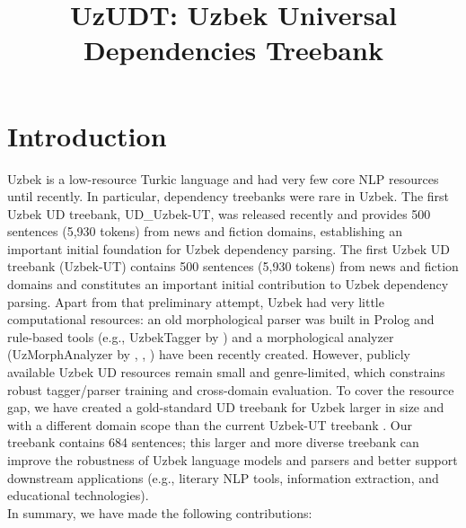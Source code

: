 \documentclass[10pt, a4paper]{article}
\title{UzUDT: Uzbek Universal Dependencies Treebank}
\begin{document}
\maketitleabstract

\section{Introduction}
\label{sec:introduction}
Uzbek is a low-resource Turkic language and had very few core NLP resources until recently\cite{veitsman-hartmann-2025-recent}. In particular, dependency treebanks were rare in Uzbek. The first Uzbek UD treebank, UD\_Uzbek-UT\cite{Akhundjanova-Talamo}, was released recently and provides 500 sentences (5,930 tokens) from news and fiction domains, establishing an important initial foundation for Uzbek dependency parsing.
The first Uzbek UD treebank (Uzbek-UT) \cite{Akhundjanova-Talamo} contains 500 sentences (5,930 tokens) from news and fiction domains and constitutes an important initial contribution to Uzbek dependency parsing. Apart from that preliminary attempt, Uzbek had very little computational resources: an old morphological parser was built in Prolog\cite{Matlatipov2009} and rule-based tools (e.g., UzbekTagger by \cite{sharipov-et-all,10615061} ) and a morphological analyzer (UzMorphAnalyzer by \cite{ulugbek-morph}, \cite{nilufar-abdurakhmon}, ) have been recently created. However, publicly available Uzbek UD resources remain small and genre-limited, which constrains robust tagger/parser training and cross-domain evaluation. To cover the resource gap, we have created a gold-standard UD treebank for Uzbek larger in size and with a different domain scope than the current Uzbek-UT treebank \cite{Akhundjanova-Talamo}. Our treebank contains 684 sentences; this larger and more diverse treebank can improve the robustness of Uzbek language models and parsers and better support downstream applications (e.g., literary NLP tools, information extraction, and educational technologies).\\
In summary, we have made the following contributions:
\end{document}
